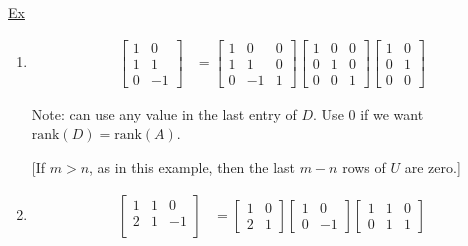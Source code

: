 \underline{Ex}
\begin{enumerate}[label=(a)]
\item 
    \begin{align*}
        \begin{bmatrix}
            1 & 0 \\
            1 & 1 \\
            0 & -1
        \end{bmatrix}
        &=
        \begin{bmatrix}
            1 & 0 & 0 \\
            1 & 1 & 0 \\
            0 & -1 & 1
        \end{bmatrix}
        \begin{bmatrix}
            1 & 0 & 0 \\
            0 & 1 & 0 \\
            0 & 0 & 1
        \end{bmatrix}
        \begin{bmatrix}
            1 & 0 \\
            0 & 1 \\
            0 & 0
        \end{bmatrix}
    \end{align*}
    
    Note: can use any value in the last entry of $D$. Use $0$ if we want $\text{rank}(D) = \text{rank}(A)$.
    
    [If $m > n$, as in this example, then the last $m-n$ rows of $U$ are zero.]

\item
        \begin{align*}
        \begin{bmatrix}
            1 & 1 & 0 \\
            2 & 1 & -1 \\
        \end{bmatrix}
        &=
        \begin{bmatrix}
            1 & 0 \\
            2 & 1
        \end{bmatrix}
        \begin{bmatrix}
            1 & 0 \\
            0 & -1 
        \end{bmatrix}
        \begin{bmatrix}
            1 & 1 & 0 \\
            0 & 1 & 1
        \end{bmatrix}
    \end{align*}
\end{enumerate}

